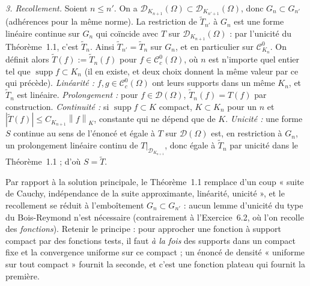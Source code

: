 \documentclass[11pt,a4paper]{article}
\newcommand{\norm}[1]{\left\|#1\right\|}
\newcommand{\Cc}{\mathcal{C}^0_c}
\DeclareMathOperator{\supp}{supp}
\newcommand{\D}{\mathcal{D}}
\theoremstyle{definition}
\begin{document}
\begin{methode}
\emph{3. Recollement.} Soient $n\le n'$. On a $\D_{K_{n+1}}(\Omega)\subset\D_{K_{n'+1}}(\Omega)$, donc $G_n\subset G_{n'}$ (adhérences pour la même norme). La restriction de $\tilde T_{n'}$ à $G_n$ est une forme linéaire continue sur $G_n$ qui coïncide avec $T$ sur $\D_{K_{n+1}}(\Omega)$ : par l'unicité du Théorème~1.1, c'est $\tilde T_n$. Ainsi $\tilde T_{n'}=\tilde T_n$ sur $G_n$, et en particulier sur $\mathcal C^0_{K_n}$. On définit alors $\tilde T(f):=\tilde T_n(f)$ pour $f\in\Cc(\Omega)$, où $n$ est n'importe quel entier tel que $\supp f\subset K_n$ (il en existe, et deux choix donnent la même valeur par ce qui précède). \emph{Linéarité :} $f,g\in\Cc(\Omega)$ ont leurs supports dans un même $K_n$, et $\tilde T_n$ est linéaire. \emph{Prolongement :} pour $f\in\D(\Omega)$, $\tilde T_n(f)=T(f)$ par construction. \emph{Continuité :} si $\supp f\subset K$ compact, $K\subset K_n$ pour un $n$ et $|\tilde T(f)|\le C_{K_{n+1}}\norm f_K$, constante qui ne dépend que de $K$. \emph{Unicité :} une forme $S$ continue au sens de l'énoncé et égale à $T$ sur $\D(\Omega)$ est, en restriction à $G_n$, un prolongement linéaire continu de $T|_{\D_{K_{n+1}}}$, donc égale à $\tilde T_n$ par unicité dans le Théorème~1.1 ; d'où $S=\tilde T$.

Par rapport à la solution principale, le Théorème~1.1 remplace d'un coup « suite de Cauchy, indépendance de la suite approximante, linéarité, unicité », et le recollement se réduit à l'emboîtement $G_n\subset G_{n'}$ : aucun lemme d'unicité du type du Bois-Reymond n'est nécessaire (contrairement à l'Exercice~6.2, où l'on recolle des \emph{fonctions}). Retenir le principe : pour approcher une fonction à support compact par des fonctions tests, il faut \emph{à la fois} des supports dans un compact fixe et la convergence uniforme sur ce compact ; un énoncé de densité « uniforme sur tout compact » fournit la seconde, et c'est une fonction plateau qui fournit la première.
\end{methode}
\end{document}
